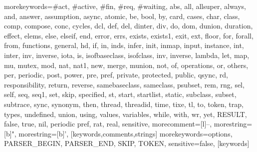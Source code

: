   {morekeywords={\#act, \#active, \#fin, \#req, \#waiting, abs, all, allsuper, always, and, answer, 
     assumption, async, atomic, be, bool, by, card, cases, char, class, comp, compose, conc, cycles,
     dcl, def, del, dinter, div, do, dom, dunion, duration, effect, elems, else, elseif, end,
     error, errs, exists, exists1, exit, ext, floor, for, forall, from, functions, 
     general, hd, if, in, inds, infer, init, inmap, input, instance, int, inter, inv, inverse, iota, is, 
     isofbaseclass, isofclass, inv, inverse, lambda, let, map, mu, mutex, mod, nat, nat1, new, merge, 
     munion, not, of, operations, or, others, per, periodic, post, power, pre, pref, 
     private, protected, public, qsync, rd, responsibility, return, reverse, samebaseclass, 
     sameclass, psubset, rem, rng, sel, self, seq, seq1, set, skip, specified, st, 
     start, startlist, static, subclass, subset, subtrace, sync, synonym, then, thread, 
     threadid, time, tixe, tl, to, token, trap, types, undefined, union, using, values, 
     variables, while, with, wr, yet, RESULT, false, true, nil, periodic pref, rat, real},
   sensitive,
   morecomment=[l]--,
   morestring=[b]",
   morestring=[b]',
  }[keywords,comments,strings]
  {morekeywords={options, PARSER\_BEGIN, PARSER\_END, SKIP, TOKEN},
   sensitive=false,
  }[keywords]

